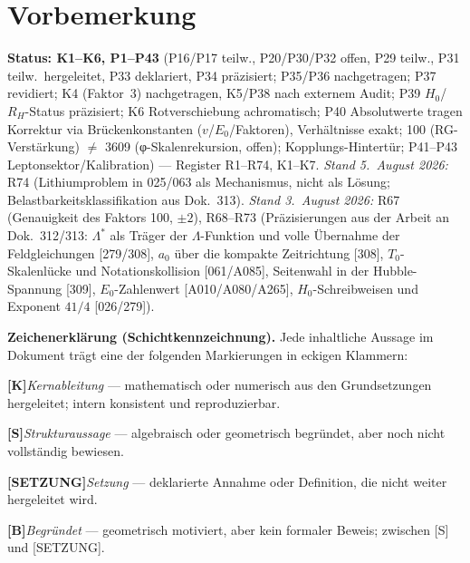 
\section*{Vorbemerkung}

\textbf{Status: K1--K6, P1--P43} (P16/P17 teilw., P20/P30/P32 offen, P29 teilw., P31 teilw.~hergeleitet, P33 deklariert, P34 präzisiert; P35/P36 nachgetragen; P37 revidiert; K4 (Faktor~3) nachgetragen, K5/P38 nach externem Audit; P39 $H_0$/$R_H$-Status präzisiert; K6 Rotverschiebung achromatisch; P40 Absolutwerte tragen Korrektur via Brückenkonstanten ($v$/$E_0$/Faktoren), Verhältnisse exakt; 100 (RG-Verstärkung) $\neq$ 3609 (φ-Skalenrekursion, offen); Kopplungs-Hintertür; P41--P43 Leptonsektor/Kalibration) --- Register R1--R74, K1--K7. \emph{Stand 5.~August 2026:} R74 (Lithiumproblem in 025/063 als Mechanismus, nicht als Lösung; Belastbarkeitsklassifikation aus Dok.~313). \emph{Stand 3.~August 2026:} R67 (Genauigkeit des Faktors 100, $\pm2$), R68--R73 (Präzisierungen aus der Arbeit an Dok.~312/313: $\Lambda^{*}$ als Träger der $\Lambda$-Funktion und volle Übernahme der Feldgleichungen [279/308], $a_0$ über die kompakte Zeitrichtung [308], $T_0$-Skalenlücke und Notationskollision [061/A085], Seitenwahl in der Hubble-Spannung [309], $E_0$-Zahlenwert [A010/A080/A265], $H_0$-Schreibweisen und Exponent $41/4$ [026/279]).

\medskip
\noindent\textbf{Zeichenerklärung (Schichtkennzeichnung).}
Jede inhaltliche Aussage im Dokument trägt eine der folgenden
Markierungen in eckigen Klammern:

\smallskip
\smallskip\noindent \textbf{[K]}\quad \emph{Kernableitung} — mathematisch oder numerisch aus den Grundsetzungen hergeleitet; intern konsistent und reproduzierbar.

\smallskip\noindent \textbf{[S]}\quad \emph{Strukturaussage} — algebraisch oder geometrisch begründet, aber noch nicht vollständig bewiesen.

\smallskip\noindent \textbf{[SETZUNG]}\quad \emph{Setzung} — deklarierte Annahme oder Definition, die nicht weiter hergeleitet wird.

\smallskip\noindent \textbf{[B]}\quad \emph{Begründet} — geometrisch motiviert, aber kein formaler Beweis; zwischen [S] und [SETZUNG].

